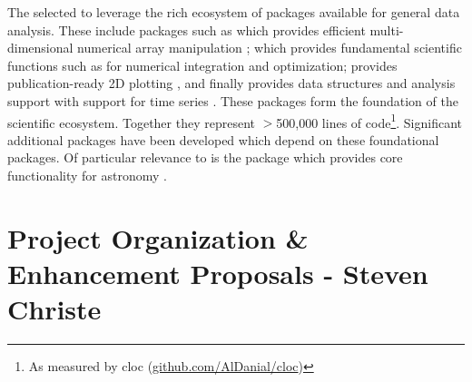 The \sunpyproj selected \python to leverage the rich ecosystem of packages available for general data analysis. 
These include packages such as  which provides efficient multi-dimensional numerical array manipulation \citep{numpy} ;  which provides fundamental scientific functions such as for numerical integration and optimization\citep{scipy};  provides publication-ready 2D plotting \citep{matplotlib}, and finally  provides data structures and analysis support with support for time series \citep{pandas}.
These packages form the foundation of the scientific \python ecosystem. 
Together they represent $>$500,000 lines of code\footnote{As measured by cloc (\url{github.com/AlDanial/cloc})}. 
Significant additional packages have been developed which depend on these foundational packages. 
Of particular relevance to \sunpypkg is the \astropypkg package which provides core functionality for astronomy \citep{astropy2018}. 








\section{Project Organization \& Enhancement Proposals - Steven Christe}

